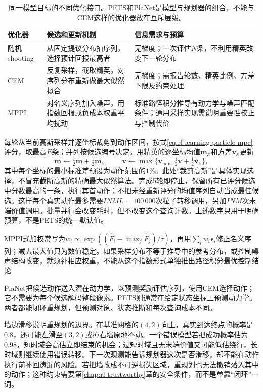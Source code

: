 \begin{table}[t]
  \centering
  \small
  \begin{tabularx}{\linewidth}{>{\raggedright\arraybackslash}p{18mm} >{\raggedright\arraybackslash}X >{\raggedright\arraybackslash}X}
    \toprule
    优化器 & 候选和更新机制 & 信息需求与预算 \\
    \midrule
    随机shooting & 从固定提议分布抽序列，选择预计回报最高者 & 无梯度；一次评估$N$条，不利用精英改变下一轮分布 \\
    CEM & 反复采样，截取精英，对序列分布重新做最大似然拟合 & 无梯度；需报告轮数、精英比例、方差下限及约束处理 \\
    MPPI & 对名义序列加入噪声，用指数回报或负成本权重平均扰动 & 标准路径积分推导有动力学与噪声匹配条件；通用采样实现需说明重要性校正与控制代价 \\
    \bottomrule
  \end{tabularx}
  \caption{同一模型目标的不同优化接口。PETS和PlaNet是模型与规划器的组合，不能与CEM这样的优化器放在互斥层级。}
  \label{tab:rl-learning-trajectory-optimizers}
\end{table}

每轮从当前高斯采样并逐坐标裁剪到动作区间，按式\eqref{eq:rl-learning-particle-mpc}评分，取最高$E$条；并列按候选编号决定。用精英的逐坐标均值$\bm m_{\mathcal E}$和方差$\bm v_{\mathcal E}$更新
\[
  \bm m\gets\tfrac12\bm m+\tfrac12\bm m_{\mathcal E},
  \qquad
  \bm v\gets\max\{\bm v_{\min},
                      \tfrac12\bm v+\tfrac12\bm v_{\mathcal E}\},
\]
其中每个坐标的最小标准差预设为动作范围的$1\%$。此处“裁剪高斯”是具体实现选择，不冒充截断高斯的精确最大似然算法。完成5轮即停止，保留所有已评分候选中分数最高的一条，执行其首动作；不把未经重新评分的均值序列自动当成最佳候选。这样每个真实动作最多需要$INML=100\,000$次粒子转移调用，另加$INM$次末端价值调用。批量并行会改变耗时，但不改变这个查询计数。上述数字只用于明确预算，不是PETS的统一默认值。

MPPI式加权常写为$w_i\propto\exp((\widehat F_i-\max_j\widehat F_j)/\tau)$，再用$\sum_iw_i\bm\epsilon_i$修正名义序列；减去最大值只为数值稳定。如果采样分布不等于推导中的参考分布，或控制噪声结构改变，就须补相应权重，不能从这个指数形式单独推出路径积分最优控制结论

PlaNet把候选动作送入潜在动力学，以预测奖励评估序列，使用CEM选择动作；它不需要为每个候选解码整段像素。PETS则通常在给定状态坐标上预测动力学。两者都能闭环重规划，但预测对象、状态推断和每次查询成本不同。

墙边滑移说明重规划的边界。在基准网格的$(4,2)$向上，真实到达终点的概率是$0.8$，还可能左滑至$(3,2)$或撞右墙原地不动。一个错误模型若把成功概率估为$0.98$，短时域会高估立即结束的机会；过短时域且无末端价值又可能低估绕行，长时域则继续使用错误转移。下一次观测能告诉规划器这次是否滑移，却不能在动作执行前补回遗漏的风险。若把墙改成不可逆损失区域，重规划也无法撤销落入其中的动作；这种约束需要第\ref{chap:rl-trustworthy}章的安全条件，而不是单靠“闭环”一词。

